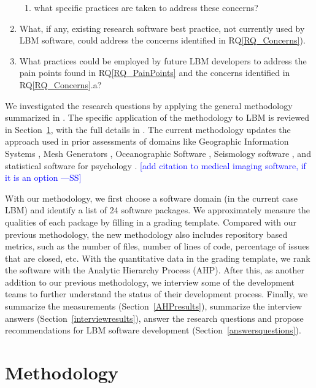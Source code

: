 \documentclass[final, 3p, times, authoryear]{elsarticle}
\newcommand{\authornote}[3]{\textcolor{#1}{[#3 ---#2]}}
\newcommand{\authornote}[3]{}
\newcommand{\wss}[1]{\authornote{blue}{SS}{#1}} %
\newcounter{rqnum} %
\newcommand{\rqref}[1]{RQ\ref{#1}}
\begin{document}
\begin{enumerate}
\begin{enumerate}
		\item [\rqref{RQ_Concerns}.b] what specific practices are taken to
		address these concerns?
	\end{enumerate}
	\item [RQ\refstepcounter{rqnum}\therqnum \label{RQ_Recommend}:]
	What, if any, existing research software best practice, not currently used
	by LBM software, could address the concerns identified in
	\rqref{RQ_Concerns}).
	\item [RQ\refstepcounter{rqnum}\therqnum \label{RQ_Future}:] What practices
	could be employed by future LBM developers to address the pain points found
	in \rqref{RQ_PainPoints} and the concerns identified in \rqref{RQ_Concerns}.a?

\end{enumerate}

We investigated the research questions by applying the general methodology
summarized in \citet{SmithEtAl2021}.  The specific application of the
methodology to LBM is reviewed in Section~\ref{methodology}, with the full
details in \citep{Michalski2021}.  The current methodology updates the approach
used in prior assessments of domains like Geographic Information Systems
\citep{SmithEtAl2018_arXivGIS}, Mesh Generators \citep{SmithEtAl2016},
Oceanographic Software \citep{smith2015state}, Seismology software
\citep{SmithEtAl2018}, and statistical software for psychology
\citep{SmithEtAl2018_StatSoft}.  \wss{add citation to medical imaging software,
if it is an option}

With our methodology, we first choose a software domain (in the current case
LBM) and identify a list of 24 software packages.  We approximately measure the
qualities of each package by filling in a grading template. Compared with our
previous methodology, the new methodology also includes repository based
metrics, such as the number of files, number of lines of code, percentage of
issues that are closed, etc.  With the quantitative data in the grading
template, we rank the software with the Analytic Hierarchy Process (AHP). After
this, as another addition to our previous methodology, we interview some of the
development teams to further understand the status of their development process.
Finally, we summarize the measurements (Section~\ref{AHPresults}), summarize the
interview answers (Section~\ref{interviewresults}), answer the research
questions and propose recommendations for LBM software development
(Section~\ref{answersquestions}).

\section{Methodology} \label{methodology}
\end{document}
